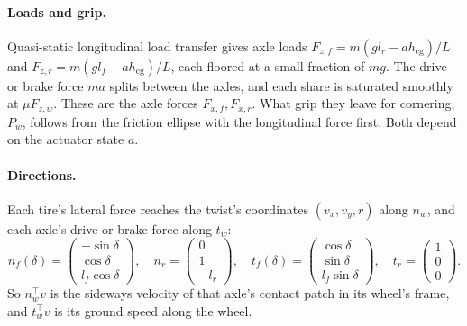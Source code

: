 \documentclass[11pt]{article}
\theoremstyle{remark}
\newcommand{\T}{^{\top}}
\begin{document}
\paragraph{Loads and grip.} Quasi-static longitudinal load transfer gives axle loads
$F_{z,f}=m(gl_r-ah_{\mathrm{cg}})/L$ and $F_{z,r}=m(gl_f+ah_{\mathrm{cg}})/L$, each floored at a
small fraction of $mg$. The drive or brake force $ma$ splits between the axles, and each share is
saturated smoothly at $\mu F_{z,w}$. These are the axle forces $F_{x,f},F_{x,r}$. What grip they
leave for cornering, $P_w$, follows from the friction ellipse with the longitudinal force first.
Both depend on the actuator state $a$.

\paragraph{Directions.} Each tire's lateral force reaches the twist's coordinates
$(v_x,v_y,r)$ along $n_w$, and each axle's drive or brake force along $t_w$:
\begin{equation}
  n_f(\delta)=\begin{pmatrix}-\sin\delta\\\cos\delta\\l_f\cos\delta\end{pmatrix},\quad
  n_r=\begin{pmatrix}0\\1\\-l_r\end{pmatrix},\quad
  t_f(\delta)=\begin{pmatrix}\cos\delta\\\sin\delta\\l_f\sin\delta\end{pmatrix},\quad
  t_r=\begin{pmatrix}1\\0\\0\end{pmatrix}.
  \label{eq:dirs}
\end{equation}
So $n_w\T v$ is the sideways velocity of that axle's contact patch in its wheel's frame, and
$t_w\T v$ is its ground speed along the wheel.
\end{document}

